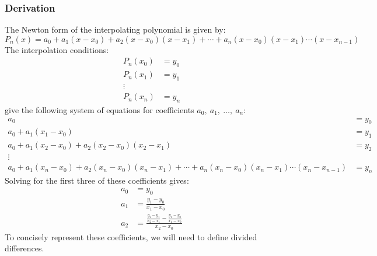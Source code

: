 \documentclass{article}
\begin{document}
\subsubsection{Derivation}
The Newton form of the interpolating polynomial is given by:
\begin{equation*}
    P_n\left( x \right) = a_0 + a_1 \left( x - x_0 \right) + a_2 \left( x - x_0 \right) \left( x - x_1 \right) + \cdots + a_n \left( x - x_0 \right) \left( x - x_1 \right) \cdots \left( x - x_{n - 1} \right)
\end{equation*}
The interpolation conditions:
\begin{align*}
    P_n\left( x_0 \right) & = y_0 \\
    P_n\left( x_1 \right) & = y_1 \\
    \vdots                        \\
    P_n\left( x_n \right) & = y_n
\end{align*}
give the following system of equations for coefficients
\(a_0,\: a_1,\: \dots,\: a_n\):
\begin{align*}
    a_0                                                                                                                                                                                               & = y_0 \\
    a_0 + a_1 \left( x_1 - x_0 \right)                                                                                                                                                                & = y_1 \\
    a_0 + a_1 \left( x_2 - x_0 \right) + a_2 \left( x_2 - x_0 \right) \left( x_2 - x_1 \right)                                                                                                        & = y_2 \\
    \vdots                                                                                                                                                                                            &       \\
    a_0 + a_1 \left( x_n - x_0 \right) + a_2 \left( x_n - x_0 \right) \left( x_n - x_1 \right) + \cdots + a_n \left( x_n - x_0 \right) \left( x_n - x_1 \right) \cdots \left( x_n - x_{n - 1} \right) & = y_n
\end{align*}
Solving for the first three of these coefficients gives:
\begin{align*}
    a_0 & = y_0                                                                         \\
    a_1 & = \frac{y_1 - y_0}{x_1 - x_0}                                                 \\
    a_2 & = \frac{\frac{y_2 - y_1}{x_2 - x_1} - \frac{y_1 - y_0}{x_1 - x_0}}{x_2 - x_0}
\end{align*}
To concisely represent these coefficients, we will need to define
divided differences.
\end{document}
